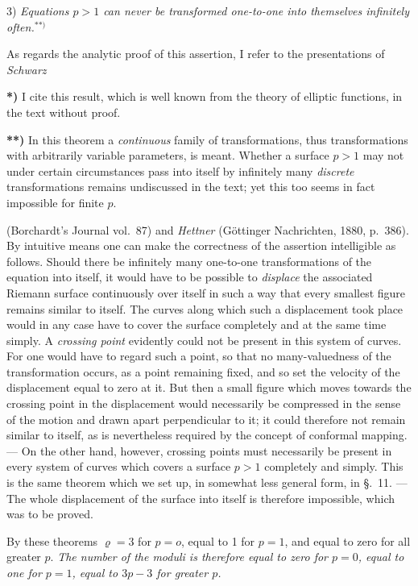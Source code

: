 \documentclass{article}
\begin{document}
3) \emph{Equations $p > 1$ can never be transformed one-to-one into themselves infinitely often.}${}^{**)}$

As regards the analytic proof of this assertion, I refer to the presentations of \emph{Schwarz}

\textbf{*)} I cite this result, which is well known from the theory of elliptic functions, in the text without proof.

\textbf{**)} In this theorem a \emph{continuous} family of transformations, thus transformations with arbitrarily variable parameters, is meant. Whether a surface $p > 1$ may not under certain circumstances pass into itself by infinitely many \emph{discrete} transformations remains undiscussed in the text; yet this too seems in fact impossible for finite $p$.

(Borchardt's Journal vol.~87) and \emph{Hettner} (Göttinger Nachrichten, 1880, p.~386). By intuitive means one can make the correctness of the assertion intelligible as follows. Should there be infinitely many one-to-one transformations of the equation into itself, it would have to be possible to \emph{displace} the associated Riemann surface continuously over itself in such a way that every smallest figure remains similar to itself. The curves along which such a displacement took place would in any case have to cover the surface completely and at the same time simply. A \emph{crossing point} evidently could not be present in this system of curves. For one would have to regard such a point, so that no many-valuedness of the transformation occurs, as a point remaining fixed, and so set the velocity of the displacement equal to zero at it. But then a small figure which moves towards the crossing point in the displacement would necessarily be compressed in the sense of the motion and drawn apart perpendicular to it; it could therefore not remain similar to itself, as is nevertheless required by the concept of conformal mapping. --- On the other hand, however, crossing points must necessarily be present in every system of curves which covers a surface $p > 1$ completely and simply. This is the same theorem which we set up, in somewhat less general form, in §.~11. --- The whole displacement of the surface into itself is therefore impossible, which was to be proved.

By these theorems $\varrho = 3$ for $p = o$, equal to 1 for $p = 1$, and equal to zero for all greater $p$. \emph{The number of the moduli is therefore equal to zero for $p = 0$, equal to one for $p = 1$, equal to $3p - 3$ for greater $p$.}
\end{document}
